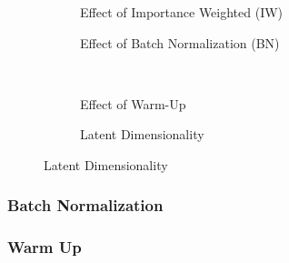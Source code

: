 \documentclass{article} %
\begin{document}
\begin{figure}
\captionsetup[subfigure]{justification=centering}
    \centering
     \begin{subfigure}[b]{0.45\textwidth}
    \resizebox{\linewidth}{!}{}
    \caption{Effect of Importance Weighted (IW)}
    \label{fig:iwlat}
    \end{subfigure}
    \hfill
    \begin{subfigure}[b]{0.45\textwidth}
    \resizebox{\linewidth}{!}{}
    \caption{Effect of Batch Normalization (BN)}
    \label{fig:bnlat}
    \end{subfigure}\\[0.3in]
    \begin{subfigure}[b]{0.45\textwidth}
    \resizebox{\linewidth}{!}{}
    \caption{Effect of Warm-Up}
    \label{fig:wulat}
    \end{subfigure}
    \hfill
    \begin{subfigure}[b]{0.45\textwidth}
    \resizebox{\linewidth}{!}{}
    \caption{Latent Dimensionality}
    \label{fig:latdimlat}
    \end{subfigure}
\end{figure}



\subsubsection{Batch Normalization}
%

\subsubsection{Warm Up}
%
\end{document}

